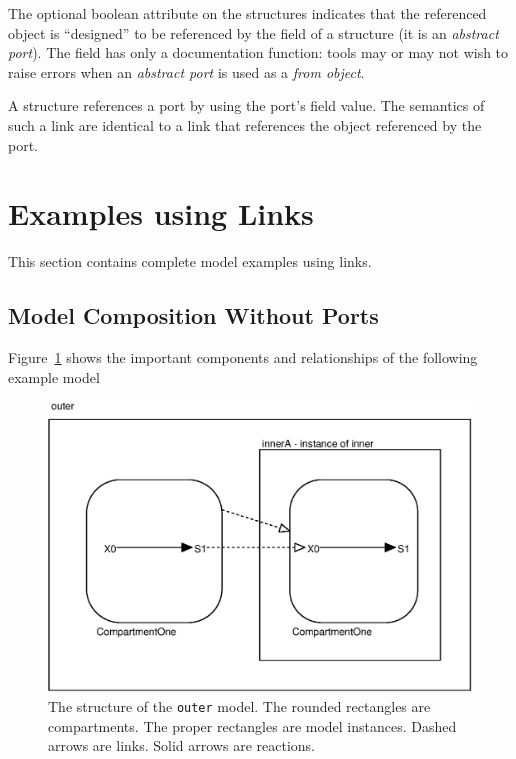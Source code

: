 \documentclass{cekarticle}
\begin{document}
The  optional boolean attribute on the  structures indicates that the referenced
object is ``designed'' to be referenced by the  field of a  structure (it is an \emph{abstract port}).
The  field has only a documentation function: tools may or may not wish to raise errors when an
\emph{abstract port} is used as a \emph{from object}.

A  structure references a port by using the port's  field value.
The semantics of such a link are identical to a link that references the object referenced by the port.

\section{Examples using Links}
\label{sec:linkexamples}

This section contains complete model examples using links.

\subsection{Model Composition Without Ports}
\label{sec:eg}

Figure~\ref{fig:eg} shows the important components and relationships of the following example model
\begin{figure}[h]
  \vspace*{8pt}
  \centering
  \includegraphics[scale = 0.7]{eg}
  \caption{The structure of the \texttt{outer} model.
  The rounded rectangles are compartments.
  The proper rectangles are model instances. Dashed arrows are links.
  Solid arrows are reactions.}
  \label{fig:eg}
\end{figure}
\end{document}
